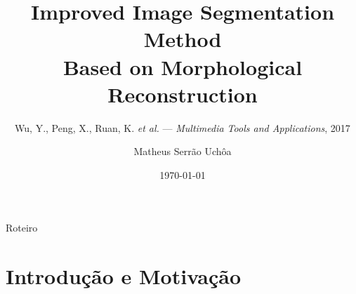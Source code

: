 \documentclass[aspectratio=169,12pt]{beamer}
\title[Segmenta\c{c}\~ao Morfol\'ogica]{Improved Image Segmentation Method\\Based on Morphological Reconstruction}
\subtitle{Wu, Y., Peng, X., Ruan, K. \textit{et al.} --- \textit{Multimedia Tools and Applications}, 2017}
\author[M.\ Uch\^oa]{Matheus Serr\~ao Uch\^oa}
\institute[UFAM/IComp]{%
  Universidade Federal do Amazonas --- IComp\\
  Processamento Digital de Imagens}
\date{\today}
\begin{document}
\begin{frame}[plain]
\titlepage
\end{frame}

\begin{frame}{Roteiro}
\tableofcontents
\end{frame}

\section{Introdu\c{c}\~ao e Motiva\c{c}\~ao}
\end{document}
